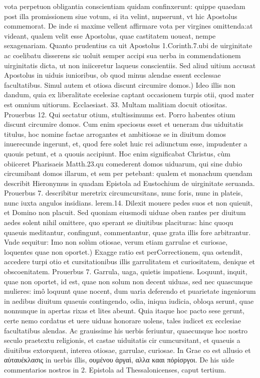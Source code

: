 \documentclass{article}
\begin{document}
\begin{pages}
\marginpar{[ p.110 ]}\pstart vota perpetuon obligantia conscientiam quidam confinxerunt: quippe quaedam post illa promissionem siue votum, si ita velint, nupserunt, vt hic Apostolus commemorat. De inde si maxime vellent affirmare vota per virgines omittenda:at videant, qualem velit esse Apostolus, quae castitatem uoueat, nempe sexagenariam. Quanto prudentius ca uit Apostolus 1.Corinth.7.ubi de uirginitate ac coelibatu disserens sic uoluit semper accipi sua uerba in commendationem uirginitatis dicta, ut non iniiceretur laqueus conscientiis. Sed aliud uitium accusat Apostolus in uiduis iunioribus, ob quod minus alendae essent ecclessae facultatibus.  \pend\pstart Simul autem et otiosa discunt circumire domos.) Ideo illis non dandum, quia ex liberalitate ecelesiae captant occasionem turpis otii, quod mater est omnium uitiorum. Ecclaesiast. 33. Multam malitiam docuit otiositas. Prouerbus 12. Qui sectatur otium, stultissimums est. Porro habentes otium discunt circumire domos. Cum enim speciosus esset et ueneram dus uiduitatis titulus, hoc nomine factae arrogantes et ambitiosae se in diuitum domos inuerecunde ingerunt, et, quod fere solet huic rei adiunctum esse, impudenter a quouis petunt, et a quouis accipiunt. Hoc enim significabat Christus, cùm obiiceret Pharisaeis Matth.23.qu comederent domos uiduarum, qui sine dubio circumibant domos illarum, et sem per petebant: qualem et monachum quendam describit Hieronymus in quadam Epistola ad Eustochium de uirginitate seruanda. Prouerbus 7. describitur meretrix circumcursitans, nunc foris, nunc in plateis, nunc iuxta angulos insidians. lerem.14. Dilexit mouere pedes suos et non quieuit, et Domino non placuit. Sed quoniam eiusmodi uiduae oben rantes per diuitum aedes solent nihil omittere, quo sperant se diuitibus placituras: hinc quoqu quaeuis meditantur, confingunt, commentantur, quae grata illis fore arbitrantur. Vnde sequitur:  \pend\pstart Imo non solùm otiosae, verum etiam garrulae et curiosae, loquentes quae non oportet.) Exagge ratio est perCorrectionem, qua ostendit, accedere turpi otio et cursitationibus illis garrulitatem et curiositatem, denique et obscoenitatem. Prouerbus 7. Garrula, uaga, quietis impatiens. Loquunt, inquit, quae non oportet, id est, quae non solum non decent uiduas, sed nec quascunque  mulieres: imô loquunt quae nocent, dum uaria deferendo et puarietate ingeniorum in aedibus  diuitum quaeuis contingendo, odia, iniqua iudicia, obloqa serunt, quae nonnunque in apertas rixas et lites abeunt. Quia itaque hoc pacto sese gerunt, certe nemo cordatus et uere uiduas honorare uolens, tales iudicet ex ecclesiae facultatibus alendas. Ac grauissime his uerbis feriuntur, quaecunque hoc nostro seculo praetextu religionis, et castae uiduitatis cir cumcursitant, et quaeuis a diuitibus extorquent, interea otiosae, garrulae, curiosae. In Grae co est allusio et αὐταυέκλασις in uerbis illis, ουμένου ἀργαὶ, αλλα κααι πόρίσργοι. De his uide commentarios nostros in 2. Epistola ad Thessalonicenses, caput tertium.  \pend
{}
{}

\end{pages}
\end{document}
